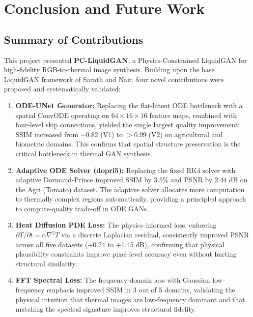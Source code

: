 \chapter{Conclusion and Future Work}
\label{Chapter7}

\section{Summary of Contributions}

This project presented \textbf{PC-LiquidGAN}, a Physics-Constrained LiquidGAN for high-fidelity RGB-to-thermal image synthesis. Building upon the base LiquidGAN framework of Sarath and Nair, four novel contributions were proposed and systematically validated:

\begin{enumerate}
    \item \textbf{ODE-UNet Generator:} Replacing the flat-latent ODE bottleneck with a spatial ConvODE operating on $64 \times 16 \times 16$ feature maps, combined with four-level skip connections, yielded the single largest quality improvement: SSIM increased from $\sim$0.82 (V1) to $>$0.99 (V2) on agricultural and biometric domains. This confirms that spatial structure preservation is the critical bottleneck in thermal GAN synthesis.

    \item \textbf{Adaptive ODE Solver (dopri5):} Replacing the fixed RK4 solver with adaptive Dormand-Prince improved SSIM by 3.5\% and PSNR by 2.44 dB on the Agri (Tomato) dataset. The adaptive solver allocates more computation to thermally complex regions automatically, providing a principled approach to compute-quality trade-off in ODE GANs.

    \item \textbf{Heat Diffusion PDE Loss:} The physics-informed loss, enforcing $\partial T/\partial t = \alpha \nabla^2 T$ via a discrete Laplacian residual, consistently improved PSNR across all five datasets (+0.24 to +1.45 dB), confirming that physical plausibility constraints improve pixel-level accuracy even without hurting structural similarity.

    \item \textbf{FFT Spectral Loss:} The frequency-domain loss with Gaussian low-frequency emphasis improved SSIM in 3 out of 5 domains, validating the physical intuition that thermal images are low-frequency dominant and that matching the spectral signature improves structural fidelity.
\end{enumerate}

